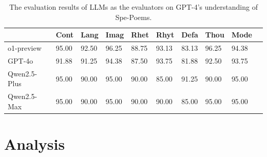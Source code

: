 \documentclass[11pt]{article}
\begin{document}
\begin{table}
  \centering
  \begin{tabular}{llllllllll}
    \hline
   &  Cont         & Lang   & Imag & Rhet
 & Rhyt & Defa & Thou & Mode \\
    \hline
    

    o1-preview & 95.00	& 92.50	& 96.25	& 88.75	& 93.13	& 83.13	& 96.25	& 94.38 \\
    
    GPT-4o & 91.88	& 91.25	& 94.38	& 87.50	& 93.75	& 81.88	& 92.50	& 93.75 \\

    Qwen2.5-Plus & 95.00	& 90.00	& 95.00	& 90.00	& 85.00	& 91.25	& 90.00	& 95.00 \\

    Qwen2.5-Max & 95.00	& 90.00	& 95.00	& 90.00	& 90.00	& 85.00	& 95.00	& 95.00 \\

    \hline
  \end{tabular}
  \caption{\label{Evaluation results for GPT-4's understanding of Spe-Poems by LLMs}
    The evaluation results of LLMs as the evaluators on GPT-4's understanding of Spe-Poems.
  }
\end{table}








\section{Analysis}
\end{document}
